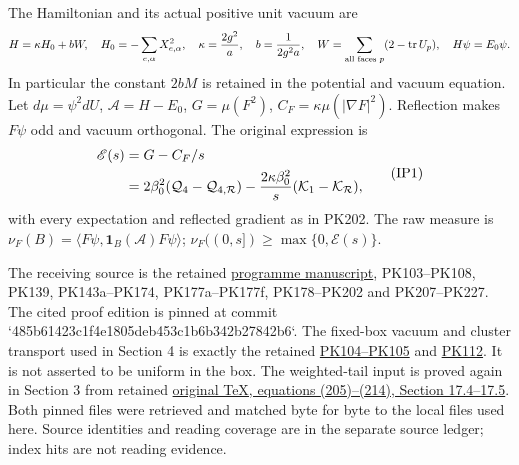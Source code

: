 \documentclass[11pt]{article}
\begin{document}
The Hamiltonian and its actual positive unit vacuum are
\[
 H=\kappa H_0+bW,\quad H_0=-\sum_{e,\alpha}X_{e,\alpha}^2,
 \quad\kappa={2g^2\over a},\quad b={1\over2g^2a},\quad
 W=\sum_{\text{all faces }p}(2-\operatorname{tr}U_p),\quad H\psi=E_0\psi.
\]
In particular the constant \(2bM\) is retained in the potential and
vacuum equation. Let \(d\mu=\psi^2dU\), \(\mathcal A=H-E_0\),
\(G=\mu(F^2)\), \(C_F=\kappa\mu(|\nabla F|^2)\). Reflection makes
\(F\psi\) odd and vacuum orthogonal. The original expression is
\[
\begin{aligned}
\mathscr E(s)&=G-C_F/s\\
 &=2\beta_0^2(\mathcal Q_4-\mathcal Q_{4,\mathcal R})
 -{2\kappa\beta_0^2\over s}(\mathcal K_1-\mathcal K_{\mathcal R}),
\end{aligned}\tag{IP1}
\]
with every expectation and reflected gradient as in PK202.
The raw measure is
\(\nu_F(B)=\langle F\psi,\mathbf1_B(\mathcal A)F\psi\rangle\);
\(\nu_F((0,s])\ge\max\{0,\mathscr E(s)\}\).

The receiving source is the retained \href{https://github.com/KokunoYumeto/yang-mills-interacting-workbench/blob/485b61423c1f4e1805deb453c1b6b342b27842b6/yang-mills/continuations/20260930-s6-ns-moment-map-bridge/PERIOD_COUPLING_AND_PHYSICAL_KERNELS.md#L2440}{programme manuscript}, PK103–PK108, PK139,
PK143a–PK174, PK177a–PK177f, PK178–PK202 and PK207–PK227.
The cited proof edition is pinned at commit
`485b61423c1f4e1805deb453c1b6b342b27842b6`.
The fixed-box vacuum and cluster transport used in Section 4 is exactly
the retained \href{https://github.com/KokunoYumeto/yang-mills-interacting-workbench/blob/485b61423c1f4e1805deb453c1b6b342b27842b6/yang-mills/continuations/20260930-s6-ns-moment-map-bridge/PERIOD_COUPLING_AND_PHYSICAL_KERNELS.md#L2480}{PK104–PK105} and \href{https://github.com/KokunoYumeto/yang-mills-interacting-workbench/blob/485b61423c1f4e1805deb453c1b6b342b27842b6/yang-mills/continuations/20260930-s6-ns-moment-map-bridge/PERIOD_COUPLING_AND_PHYSICAL_KERNELS.md#L2632}{PK112}. It is not asserted to be
uniform in the box. The weighted-tail input is proved again in Section 3
from retained \href{https://github.com/KokunoYumeto/yang-mills-interacting-workbench/blob/485b61423c1f4e1805deb453c1b6b342b27842b6/yang-mills/continuations/20260930-s6-ns-moment-map-bridge/sources/spatial/spatial_continuum.tex#L3875}{original TeX, equations (205)–(214), Section 17.4–17.5}. Both pinned files were retrieved and matched byte for byte to the local files used here. Source identities and reading coverage are in the
separate source ledger; index hits are not reading evidence.
\end{document}
